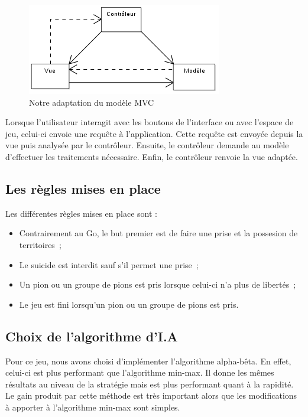 \documentclass[11pt,a4paper]{article}
\begin{document}
	\begin{figure}[!ht]
    	\begin{center}
			\includegraphics{ModeleMVC.png}
		\end{center}
	\caption{Notre adaptation du modèle MVC}
	\label{modeleMVC}
	\end{figure}

	Lorsque l'utilisateur interagit avec les boutons de l'interface ou avec
	l'espace de jeu, celui-ci envoie une requête à l'application.
	Cette requête est envoyée depuis la vue puis analysée par le contrôleur.
	Ensuite, le contrôleur demande au modèle d'effectuer les traitements
	nécessaire. Enfin, le contrôleur renvoie la vue adaptée.
	

	\subsection{Les règles mises en place}
		\label{regles}

	Les différentes règles mises en place sont :
	
	\begin{itemize}
		\item Contrairement au Go, le but premier est de faire une prise et la
		possesion de territoires~;
		\item Le suicide est interdit sauf s'il permet une prise~;
		\item Un pion ou un groupe de pions est pris lorsque celui-ci n'a plus de
		libertés~;
		\item Le jeu est fini lorsqu'un pion ou un groupe de pions est pris.
	\end{itemize}

	\subsection{Choix de l'algorithme d'I.A}
		\label{choix_alpha_beta}
	Pour ce jeu, nous avons choisi d'implémenter l'algorithme alpha-bêta. En
	effet, celui-ci est plus performant que l'algorithme min-max. Il donne les
	mêmes résultats au niveau de la stratégie mais est plus performant quant à la
	rapidité. Le gain produit par cette méthode est très important alors que les
	modifications à apporter à l'algorithme min-max sont simples.
	
\end{document}
